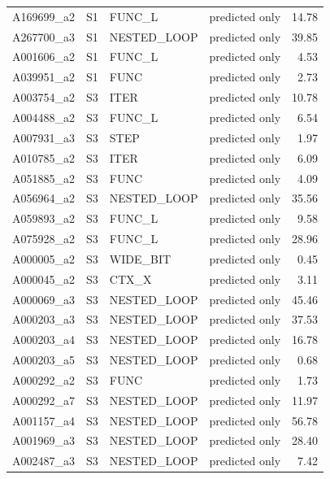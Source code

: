 \begin{table}[!ht]
\begin{tabular}{llllr}
A169699\_a2 & S1 & FUNC\_L & predicted only & 14.78 \\
A267700\_a3 & S1 & NESTED\_LOOP & predicted only & 39.85 \\
A001606\_a2 & S1 & FUNC\_L & predicted only & 4.53 \\
A039951\_a2 & S1 & FUNC & predicted only & 2.73 \\
A003754\_a2 & S3 & ITER & predicted only & 10.78 \\
A004488\_a2 & S3 & FUNC\_L & predicted only & 6.54 \\
A007931\_a3 & S3 & STEP & predicted only & 1.97 \\
A010785\_a2 & S3 & ITER & predicted only & 6.09 \\
A051885\_a2 & S3 & FUNC & predicted only & 4.09 \\
A056964\_a2 & S3 & NESTED\_LOOP & predicted only & 35.56 \\
A059893\_a2 & S3 & FUNC\_L & predicted only & 9.58 \\
A075928\_a2 & S3 & FUNC\_L & predicted only & 28.96 \\
A000005\_a2 & S3 & WIDE\_BIT & predicted only & 0.45 \\
A000045\_a2 & S3 & CTX\_X & predicted only & 3.11 \\
A000069\_a3 & S3 & NESTED\_LOOP & predicted only & 45.46 \\
A000203\_a3 & S3 & NESTED\_LOOP & predicted only & 37.53 \\
A000203\_a4 & S3 & NESTED\_LOOP & predicted only & 16.78 \\
A000203\_a5 & S3 & NESTED\_LOOP & predicted only & 0.68 \\
A000292\_a2 & S3 & FUNC & predicted only & 1.73 \\
A000292\_a7 & S3 & NESTED\_LOOP & predicted only & 11.97 \\
A001157\_a4 & S3 & NESTED\_LOOP & predicted only & 56.78 \\
A001969\_a3 & S3 & NESTED\_LOOP & predicted only & 28.40 \\
A002487\_a3 & S3 & NESTED\_LOOP & predicted only & 7.42 \\
\bottomrule\end{tabular}\end{table}


